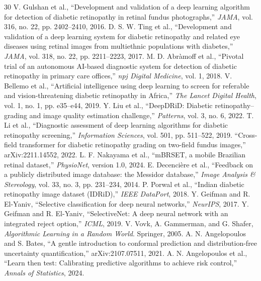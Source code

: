 \documentclass[journal]{IEEEtran}
\begin{document}
\begin{thebibliography}{30}
 V. Gulshan et al., ``Development and validation of a deep learning algorithm for detection of diabetic retinopathy in retinal fundus photographs,'' \emph{JAMA}, vol. 316, no. 22, pp. 2402--2410, 2016.
 D. S. W. Ting et al., ``Development and validation of a deep learning system for diabetic retinopathy and related eye diseases using retinal images from multiethnic populations with diabetes,'' \emph{JAMA}, vol. 318, no. 22, pp. 2211--2223, 2017.
 M. D. Abr\`amoff et al., ``Pivotal trial of an autonomous AI-based diagnostic system for detection of diabetic retinopathy in primary care offices,'' \emph{npj Digital Medicine}, vol. 1, 2018.
 V. Bellemo et al., ``Artificial intelligence using deep learning to screen for referable and vision-threatening diabetic retinopathy in Africa,'' \emph{The Lancet Digital Health}, vol. 1, no. 1, pp. e35--e44, 2019.
 Y. Liu et al., ``DeepDRiD: Diabetic retinopathy--grading and image quality estimation challenge,'' \emph{Patterns}, vol. 3, no. 6, 2022.
 T. Li et al., ``Diagnostic assessment of deep learning algorithms for diabetic retinopathy screening,'' \emph{Information Sciences}, vol. 501, pp. 511--522, 2019.
 ``Cross-field transformer for diabetic retinopathy grading on two-field fundus images,'' arXiv:2211.14552, 2022.
 L. F. Nakayama et al., ``mBRSET, a mobile Brazilian retinal dataset,'' \emph{PhysioNet}, version 1.0, 2024.
 E. Decenci\`ere et al., ``Feedback on a publicly distributed image database: the Messidor database,'' \emph{Image Analysis \& Stereology}, vol. 33, no. 3, pp. 231--234, 2014.
 P. Porwal et al., ``Indian diabetic retinopathy image dataset (IDRiD),'' \emph{IEEE DataPort}, 2018.
 Y. Geifman and R. El-Yaniv, ``Selective classification for deep neural networks,'' \emph{NeurIPS}, 2017.
 Y. Geifman and R. El-Yaniv, ``SelectiveNet: A deep neural network with an integrated reject option,'' \emph{ICML}, 2019.
 V. Vovk, A. Gammerman, and G. Shafer, \emph{Algorithmic Learning in a Random World}. Springer, 2005.
 A. N. Angelopoulos and S. Bates, ``A gentle introduction to conformal prediction and distribution-free uncertainty quantification,'' arXiv:2107.07511, 2021.
 A. N. Angelopoulos et al., ``Learn then test: Calibrating predictive algorithms to achieve risk control,'' \emph{Annals of Statistics}, 2024.

\end{thebibliography}
\end{document}
